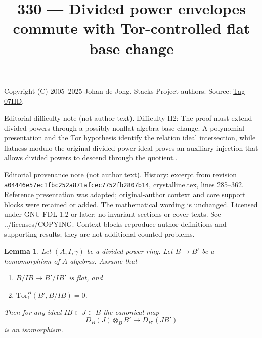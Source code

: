 \documentclass{amsart}
\theoremstyle{plain}
\newtheorem{lemma}[subsection]{Lemma}
\theoremstyle{definition}
\theoremstyle{remark}
\numberwithin{equation}{subsection}
\begin{document}
\title[Stacks Project, Tag 07HD]{330 --- Divided power envelopes commute with Tor-controlled flat base change}
\maketitle
\noindent Copyright (C) 2005--2025 Johan de Jong. Stacks Project authors. Source: \href{https://stacks.math.columbia.edu/tag/07HD}{Tag 07HD}.

\noindent Editorial difficulty note (not author text). Difficulty H2: The proof must extend divided powers through a possibly nonflat algebra base change. A polynomial presentation and the Tor hypothesis identify the relation ideal intersection, while flatness modulo the original divided power ideal proves an auxiliary injection that allows divided powers to descend through the quotient..

\noindent Editorial provenance note (not author text). History: excerpt from revision \texttt{a0444\allowbreak 6e57e\allowbreak c1fbc\allowbreak 252a8\allowbreak 71afc\allowbreak ec775\allowbreak 2fb28\allowbreak 07b14}, crystalline.tex, lines 285--362. Reference presentation was adapted; original-author context and core support blocks were retained or added. The mathematical wording is unchanged. Licensed under GNU FDL 1.2 or later; no invariant sections or cover texts. See ../licenses/COPYING. Context blocks reproduce author definitions and supporting results; they are not additional counted problems.

\begin{lemma}
\label{lemma-flat-base-change-divided-power-envelope}
Let $(A, I, \gamma)$ be a divided power ring.
Let $B \to B'$ be a homomorphism of $A$-algebras.
Assume that
\begin{enumerate}
\item $B/IB \to B'/IB'$ is flat, and
\item $\text{Tor}_1^B(B', B/IB) = 0$.
\end{enumerate}
Then for any ideal $IB \subset J \subset B$ the canonical map
$$
D_B(J) \otimes_B B' \longrightarrow D_{B'}(JB')
$$
is an isomorphism.
\end{lemma}
\end{document}
